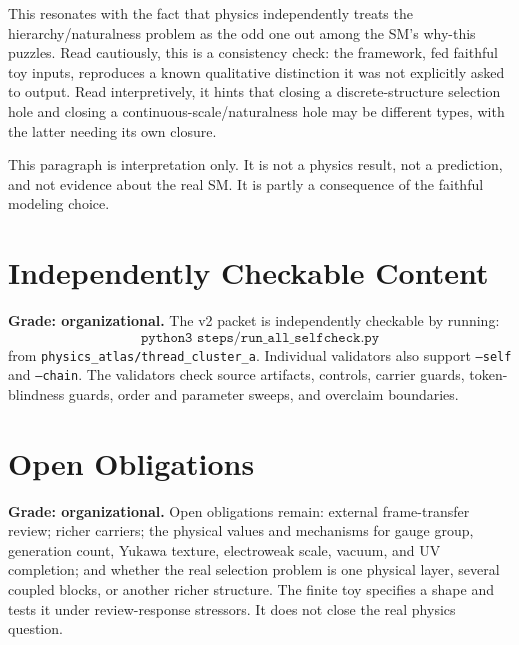 \documentclass[11pt]{article}
\begin{document}
This resonates with the fact that physics independently treats the hierarchy/naturalness problem as the odd one out among the SM's why-this puzzles. Read cautiously, this is a consistency check: the framework, fed faithful toy inputs, reproduces a known qualitative distinction it was not explicitly asked to output. Read interpretively, it hints that closing a discrete-structure selection hole and closing a continuous-scale/naturalness hole may be different types, with the latter needing its own closure.

This paragraph is interpretation only. It is not a physics result, not a prediction, and not evidence about the real SM. It is partly a consequence of the faithful modeling choice.

\section{Independently Checkable Content}

\textbf{Grade: organizational.}
The v2 packet is independently checkable by running:
\[
\texttt{python3 steps/run\_all\_selfcheck.py}
\]
from \texttt{physics\_atlas/thread\_cluster\_a}. Individual validators also support \texttt{--self} and \texttt{--chain}. The validators check source artifacts, controls, carrier guards, token-blindness guards, order and parameter sweeps, and overclaim boundaries.

\section{Open Obligations}

\textbf{Grade: organizational.}
Open obligations remain: external frame-transfer review; richer carriers; the physical values and mechanisms for gauge group, generation count, Yukawa texture, electroweak scale, vacuum, and UV completion; and whether the real selection problem is one physical layer, several coupled blocks, or another richer structure. The finite toy specifies a shape and tests it under review-response stressors. It does not close the real physics question.
\end{document}
